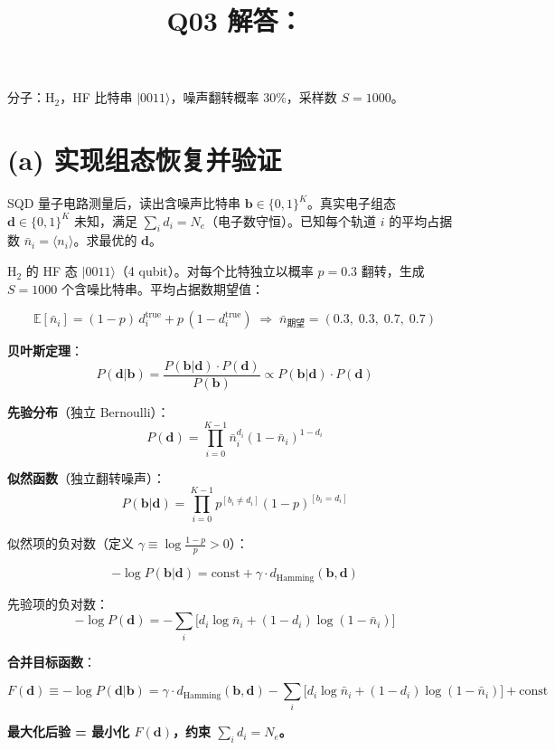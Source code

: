 \documentclass[11pt,a4paper]{article}
\title{Q03 解答：}
\author{}
\date{}
\begin{document}
\maketitle

分子：H$_2$，HF 比特串 $|0011\rangle$，噪声翻转概率 30\%，采样数 $S = 1000$。

\section{(a) 实现组态恢复并验证}

SQD 量子电路测量后，读出含噪声比特串 $\mathbf{b} \in \{0,1\}^K$。真实电子组态 $\mathbf{d} \in \{0,1\}^K$ 未知，满足 $\sum_i d_i = N_e$（电子数守恒）。已知每个轨道 $i$ 的平均占据数 $\bar{n}_i = \langle n_i \rangle$。求最优的 $\mathbf{d}$。

H$_2$ 的 HF 态 $|0011\rangle$（4 qubit）。对每个比特独立以概率 $p = 0.3$ 翻转，生成 $S = 1000$ 个含噪比特串。平均占据数期望值：

$$\mathbb{E}[\bar{n}_i] = (1-p)\,d_i^{\text{true}} + p\,(1 - d_i^{\text{true}}) \;\Rightarrow\; \bar{n}_{\text{期望}} = (0.3,\; 0.3,\; 0.7,\; 0.7)$$

\textbf{贝叶斯定理}：
$$P(\mathbf{d} | \mathbf{b}) = \frac{P(\mathbf{b} | \mathbf{d}) \cdot P(\mathbf{d})}{P(\mathbf{b})} \propto P(\mathbf{b} | \mathbf{d}) \cdot P(\mathbf{d})$$

\textbf{先验分布}（独立 Bernoulli）：
$$P(\mathbf{d}) = \prod_{i=0}^{K-1} \bar{n}_i^{d_i} (1 - \bar{n}_i)^{1-d_i}$$

\textbf{似然函数}（独立翻转噪声）：
$$P(\mathbf{b} | \mathbf{d}) = \prod_{i=0}^{K-1} p^{[b_i \neq d_i]} (1-p)^{[b_i = d_i]}$$

似然项的负对数（定义 $\gamma \equiv \log\frac{1-p}{p} > 0$）：

$$-\log P(\mathbf{b} | \mathbf{d}) = \text{const} + \gamma \cdot d_{\text{Hamming}}(\mathbf{b}, \mathbf{d})$$

先验项的负对数：
$$-\log P(\mathbf{d}) = -\sum_i \Big[ d_i \log \bar{n}_i + (1-d_i) \log(1-\bar{n}_i) \Big]$$

\textbf{合并目标函数}：

$$\boxed{F(\mathbf{d}) \equiv -\log P(\mathbf{d} | \mathbf{b}) = \gamma \cdot d_{\text{Hamming}}(\mathbf{b}, \mathbf{d}) - \sum_i \Big[ d_i \log \bar{n}_i + (1-d_i) \log(1-\bar{n}_i) \Big] + \text{const}}$$

\textbf{最大化后验 = 最小化 $F(\mathbf{d})$，约束 $\sum_i d_i = N_e$。}
\end{document}
